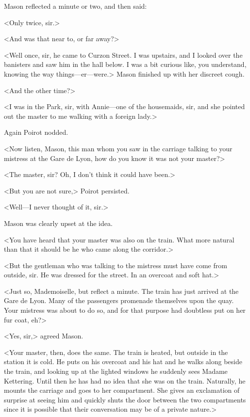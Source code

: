 Mason reflected a minute or two, and then said:

<Only twice, sir.>

<And was that near to, or far away?>

<Well once, sir, he came to Curzon Street. I was upstairs, and I looked over the banisters and saw him in the hall below. I was a bit curious like, you understand, knowing the way things—er—were.> Mason finished up with her discreet cough.

<And the other time?>

<I was in the Park, sir, with Annie—one of the housemaids, sir, and she pointed out the master to me walking with a foreign lady.>

Again Poirot nodded.

<Now listen, Mason, this man whom you saw in the carriage talking to your mistress at the Gare de Lyon, how do you know it was not your master?>

<The master, sir? Oh, I don't think it could have been.>

<But you are not sure,> Poirot persisted.

<Well—I never thought of it, sir.>

Mason was clearly upset at the idea.

<You have heard that your master was also on the train. What more natural than that it should be he who came along the corridor.>

<But the gentleman who was talking to the mistress must have come from outside, sir. He was dressed for the street. In an overcoat and soft hat.>

<Just so, Mademoiselle, but reflect a minute. The train has just arrived at the Gare de Lyon. Many of the passengers promenade themselves upon the quay. Your mistress was about to do so, and for that purpose had doubtless put on her fur coat, eh?>

<Yes, sir,> agreed Mason.

<Your master, then, does the same. The train is heated, but outside in the station it is cold. He puts on his overcoat and his hat and he walks along beside the train, and looking up at the lighted windows he suddenly sees Madame Kettering. Until then he has had no idea that she was on the train. Naturally, he mounts the carriage and goes to her compartment. She gives an exclamation of surprise at seeing him and quickly shuts the door between the two compartments since it is possible that their conversation may be of a private nature.>

